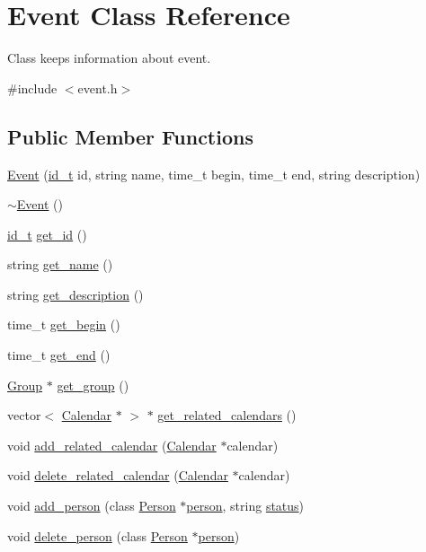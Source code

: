 \hypertarget{classEvent}{
\section{Event Class Reference}
\label{d5/da5/classEvent}
}


Class keeps information about event.  




{\ttfamily \#include $<$event.h$>$}

\subsection*{Public Member Functions}
\begin{DoxyCompactItemize}
\item 
\hyperlink{classEvent_aeec95af5c9bf0410dc9078485dedb2bf}{Event} (\hyperlink{types_8h_ac948e8774f26ce7ea57a66b925e451b9}{id\_\-t} id, string name, time\_\-t begin, time\_\-t end, string description)
\item 
\hyperlink{classEvent_a7704ec01ce91e673885792054214b3d2}{$\sim$Event} ()
\item 
\hyperlink{types_8h_ac948e8774f26ce7ea57a66b925e451b9}{id\_\-t} \hyperlink{classEvent_a526943d871f71a59016637c27da80c23}{get\_\-id} ()
\item 
string \hyperlink{classEvent_a99325a5304e3b73cd4df1f356a185cfc}{get\_\-name} ()
\item 
string \hyperlink{classEvent_a07fdb4a55424b028bfb64db3cea94c07}{get\_\-description} ()
\item 
time\_\-t \hyperlink{classEvent_aa0177bde2838d761774f6e9a50f1e76c}{get\_\-begin} ()
\item 
time\_\-t \hyperlink{classEvent_a25baaf84cc87da4b866f266f946c1d8f}{get\_\-end} ()
\item 
\hyperlink{classGroup}{Group} $\ast$ \hyperlink{classEvent_a5736ec29101416a0358b709c964bf50d}{get\_\-group} ()
\item 
vector$<$ \hyperlink{classCalendar}{Calendar} $\ast$ $>$ $\ast$ \hyperlink{classEvent_ab2329f2021caee686920d5ab2cfa8569}{get\_\-related\_\-calendars} ()
\item 
void \hyperlink{classEvent_a1d59dc31b3358bb9d9d1e75cb735c6ef}{add\_\-related\_\-calendar} (\hyperlink{classCalendar}{Calendar} $\ast$calendar)
\item 
void \hyperlink{classEvent_ac4bc91dab8ca340c58aed7c91a8376a7}{delete\_\-related\_\-calendar} (\hyperlink{classCalendar}{Calendar} $\ast$calendar)
\item 
void \hyperlink{classEvent_a77077d8d27027113b2e20b4374a00a61}{add\_\-person} (class \hyperlink{classPerson}{Person} $\ast$\hyperlink{group__content_8h_ab8664e6fd42f01eeaad084b5e20eb54e}{person}, string \hyperlink{group__content_8h_ab4d38e7365d935f2a5f1403eec29127e}{status})
\item 
void \hyperlink{classEvent_a5e071ee79b9ac9520fa5f26d763ce662}{delete\_\-person} (class \hyperlink{classPerson}{Person} $\ast$\hyperlink{group__content_8h_ab8664e6fd42f01eeaad084b5e20eb54e}{person})
\end{DoxyCompactItemize}


